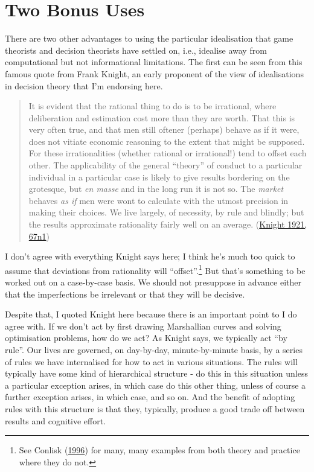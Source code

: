 \documentclass[
  12pt,
  letterpaper,
  DIV=11,
  numbers=noendperiod]{scrreprt}
\begin{document}
\hypertarget{sec-ideal-bonus}{%
\section{Two Bonus Uses}\label{sec-ideal-bonus}}

There are two other advantages to using the particular idealisation that
game theorists and decision theorists have settled on, i.e., idealise
away from computational but not informational limitations. The first can
be seen from this famous quote from Frank Knight, an early proponent of
the view of idealisations in decision theory that I'm endorsing here.

\begin{quote}
It is evident that the rational thing to do is to be irrational, where
deliberation and estimation cost more than they are worth. That this is
very often true, and that men still oftener (perhaps) behave as if it
were, does not vitiate economic reasoning to the extent that might be
supposed. For these irrationalities (whether rational or irrational!)
tend to offset each other. The applicability of the general ``theory''
of conduct to a particular individual in a particular case is likely to
give results bordering on the grotesque, but \emph{en masse} and in the
long run it is not so. The \emph{market} behaves \emph{as if} men were
wont to calculate with the utmost precision in making their choices. We
live largely, of necessity, by rule and blindly; but the results
approximate rationality fairly well on an average.
(\protect\hyperlink{ref-Knight1921}{Knight 1921, 67n1})
\end{quote}

I don't agree with everything Knight says here; I think he's much too
quick to assume that deviations from rationality will
``offset''.\footnote{See Conlisk
  (\protect\hyperlink{ref-Conlisk1996}{1996}) for many, many examples
  from both theory and practice where they do not.} But that's something
to be worked out on a case-by-case basis. We should not presuppose in
advance either that the imperfections be irrelevant or that they will be
decisive.

Despite that, I quoted Knight here because there is an important point
to I do agree with. If we don't act by first drawing Marshallian curves
and solving optimisation problems, how do we act? As Knight says, we
typically act ``by rule''. Our lives are governed, on day-by-day,
minute-by-minute basis, by a series of rules we have internalised for
how to act in various situations. The rules will typically have some
kind of hierarchical structure - do this in this situation unless a
particular exception arises, in which case do this other thing, unless
of course a further exception arises, in which case, and so on. And the
benefit of adopting rules with this structure is that they, typically,
produce a good trade off between results and cognitive effort.
\end{document}
